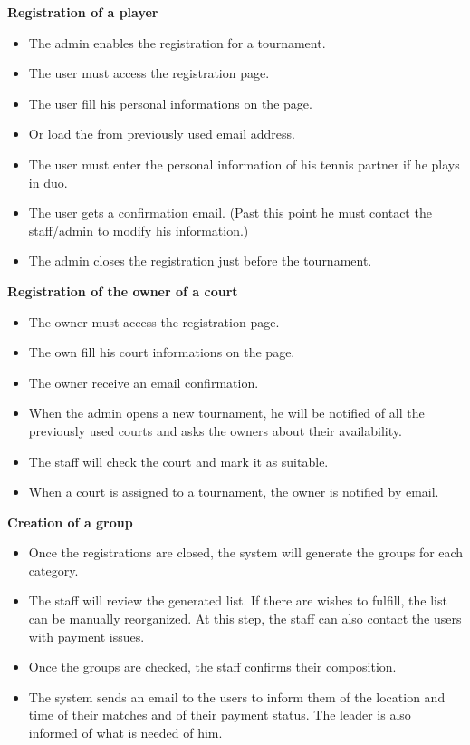 \documentclass[a4paper, 12pt]{article}
\begin{document}
\textbf{Registration of a player}

\begin{itemize}
	\item The admin enables the registration for a tournament.
	\item The user must access the registration page.
	\item The user fill his personal informations on the page.
	\item Or load the from previously used email address. 
	\item The user must enter the personal information of his tennis partner if he plays in duo.
	\item The user gets a confirmation email. (Past this point he must contact the staff/admin to modify his information.)
	\item The admin closes the registration just before the tournament.
\end{itemize}



\textbf{Registration of the owner of a court}

\begin{itemize}
	\item The owner must access the registration page.
	\item The own fill his court informations on the page.
	\item The owner receive an email confirmation.
	\item When the admin opens a new tournament, he will be notified of all the previously used courts and asks the owners about their availability.
	\item The staff will check the court and mark it as suitable.
	\item When a court is assigned to a tournament, the owner is notified by email.
\end{itemize}


\textbf{Creation of a group}

\begin{itemize}
	\item Once the registrations are closed, the system will generate the groups for each category.
	\item The staff will review the generated list. If there are wishes to fulfill, the list can be manually reorganized. At this step, the staff can also contact the users with payment issues.
	\item Once the groups are checked, the staff confirms their composition.
	\item The system sends an email to the users to inform them of the location and time of their matches and of their payment status. The leader is also informed of what is needed of him.
\end{itemize}
\end{document}
